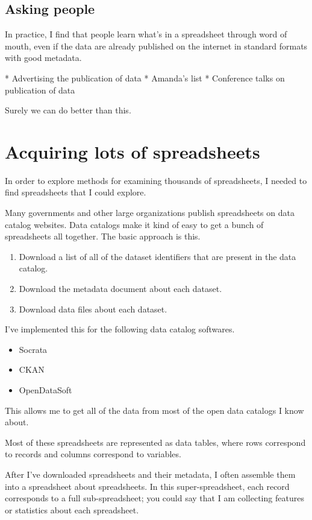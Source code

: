 \documentclass{acm_proc_article-sp}
\begin{document}
\subsection{Asking people}
In practice, I find that people learn what's in a spreadsheet through word
of mouth, even if the data are already published on the internet in standard
formats with good metadata.

* Advertising the publication of data
* Amanda's list
* Conference talks on publication of data

Surely we can do better than this.

\section{Acquiring lots of spreadsheets}
In order to explore methods for examining thousands of spreadsheets,
I needed to find spreadsheets that I could explore.

Many governments and other large organizations publish spreadsheets on
data catalog websites.
Data catalogs make it kind of easy to get a bunch of spreadsheets all together.
The basic approach is this.

\begin{enumerate}
\item Download a list of all of the dataset identifiers that are present in the data catalog.
\item Download the metadata document about each dataset.
\item Download data files about each dataset.
\end{enumerate}

I've implemented this for the following data catalog softwares.

\begin{itemize}
\item Socrata
\item CKAN
\item OpenDataSoft
\end{itemize}

This allows me to get all of the data from most of the open data catalogs I know about.

Most of these spreadsheets are represented as data tables,
where rows correspond to records and columns correspond to variables. \cite{table}

After I've downloaded spreadsheets and their metadata,
I often assemble them into a spreadsheet about spreadsheets. \cite{data-driven}
In this super-spreadsheet, each record corresponds to a full
sub-spreadsheet; you could say that I am collecting features or statistics
about each spreadsheet.
\end{document}
